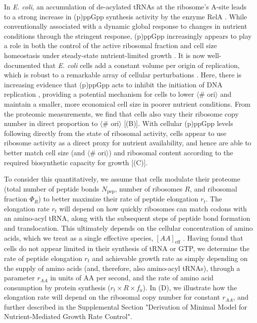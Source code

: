 In \textit{E. coli}, an accumulation of de-acylated tRNAs at the ribosome's
A-site leads to a strong increase in (p)ppGpp synthesis activity by the enzyme
RelA \citep{hauryliuk2015}. While conventionally associated with a dynamic
global response to changes in nutrient conditions through the stringent
response, (p)ppGpp increasingly appears to play a role in both the control of
the active ribosomal fraction and cell size homeostasis under steady-state
nutrient-limited growth \citep{dai2016, zhu2019, Buke2020, vadia2017,
parker2020}. It is now well-documented that \textit{E. coli} cells add a
constant volume per origin of replication, which is robust to a remarkable array
of cellular perturbations \citep{si2017}. Here, there is increasing evidence
that (p)ppGpp acts to inhibit the initiation of DNA replication
\citep{fernandezcoll2020}, providing a potential mechanism for cells to lower
$\langle$\# ori$\rangle$ and maintain a smaller, more economical cell size in
poorer nutrient conditions. From the proteomic measurements, we find that cells
also vary their ribosome copy number in direct proportion to $\langle$\#
ori$\rangle$ [(B)]. With cellular (p)ppGpp levels
following directly from the state of ribosomal activity, cells appear to use
ribosome activity as a direct proxy for nutrient availability, and hence are
able to better match cell size (and $\langle$\# ori$\rangle$) and ribosomal
content according to the required biosynthetic capacity for growth
[(C)].

To consider this quantitatively, we assume that cells modulate their proteome
(total number of peptide bonds $N_\text{pep}$, number of ribosomes $R$, and
ribosomal fraction $\Phi_R$) to better maximize their rate of peptide elongation
$r_t$. The elongation rate $r_t$ will depend on how quickly ribosomes can match
codons with an amino-acyl tRNA, along with the subsequent steps of peptide bond
formation and translocation. This ultimately depends on the cellular
concentration of amino acids, which we treat as a single effective species,
$[AA]_\text{eff}$ \citep{bosdriesz2015}. Having found that cells do not appear limited
in their synthesis of tRNA or GTP, we determine the rate of peptide elongation
$r_t$ and achievable growth rate as simply depending on the supply of amino
acids (and, therefore, also amino-acyl tRNAs), through a parameter $r_{AA}$ in
units of AA per second, and the rate of amino acid consumption by protein
synthesis ($r_t \times R \times f_a$). In (D), we
illustrate how the elongation rate will depend on the ribosomal copy number for
constant $r_{AA}$, and further described in the Supplemental Section
"Derivation of Minimal Model for Nutrient-Mediated Growth Rate Control".


